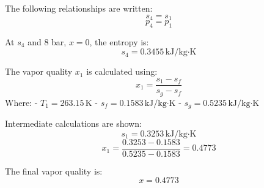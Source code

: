 The following relationships are written:  
\[
s_4 = s_1
\]  
\[
p_4 = p_1
\]  

At \(s_4\) and 8 bar, \(x = 0\), the entropy is:  
\[
s_4 = 0.3455 \, \text{kJ/kg·K}
\]  

The vapor quality \(x_1\) is calculated using:  
\[
x_1 = \frac{s_1 - s_f}{s_g - s_f}
\]  
Where:  
- \(T_1 = 263.15 \, \text{K}\)  
- \(s_f = 0.1583 \, \text{kJ/kg·K}\)  
- \(s_g = 0.5235 \, \text{kJ/kg·K}\)  

Intermediate calculations are shown:  
\[
s_1 = 0.3253 \, \text{kJ/kg·K}
\]  
\[
x_1 = \frac{0.3253 - 0.1583}{0.5235 - 0.1583} = 0.4773
\]  

The final vapor quality is:  
\[
x = 0.4773
\]